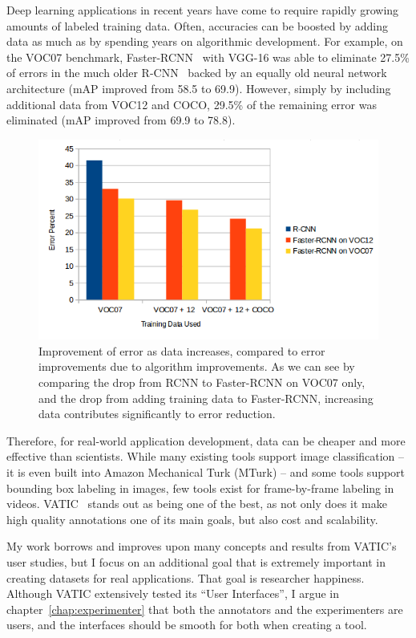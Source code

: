Deep learning applications in recent years have come to require rapidly growing amounts of labeled training data.
Often, accuracies can be boosted by adding data as much as by spending years on algorithmic development.
For example, on the VOC07 benchmark, Faster-RCNN~\cite{FasterRCNN} with VGG-16 was able to eliminate 27.5\% of errors in the much older R-CNN~\cite{RCNN} backed by an equally old neural network architecture (mAP improved from 58.5 to 69.9).
However, simply by including additional data from VOC12 and COCO, 29.5\% of the remaining error was eliminated (mAP improved from 69.9 to 78.8).

\begin{figure}[h]
\includegraphics[width=14cm]{figs/data_vs_error.png}
\centering
\caption{Improvement of error as data increases, compared to error improvements due to algorithm improvements.
As we can see by comparing the drop from RCNN to Faster-RCNN on VOC07 only, and the drop from adding training data to Faster-RCNN, increasing data contributes significantly to error reduction.}
\end{figure}

Therefore, for real-world application development, data can be cheaper and more effective than scientists.
While many existing tools support image classification -- it is even built into Amazon Mechanical Turk (MTurk) -- and some tools support bounding box labeling in images, few tools exist for frame-by-frame labeling in videos.
VATIC~\cite{Vatic} stands out as being one of the best, as not only does it make high quality annotations one of its main goals, but also cost and scalability.

My work borrows and improves upon many concepts and results from VATIC's user studies, but I focus on an additional goal that is extremely important in creating datasets for real applications. That goal is researcher happiness.
Although VATIC extensively tested its ``User Interfaces'', I argue in chapter~\ref{chap:experimenter} that both the annotators and the experimenters are users, and the interfaces should be smooth for both when creating a tool.

